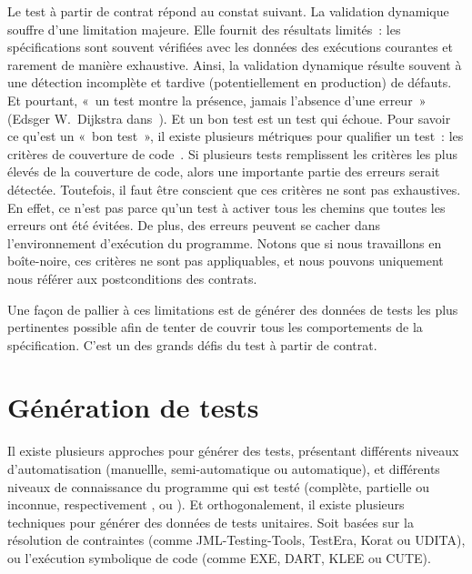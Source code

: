 Le test à partir de contrat répond au constat suivant. La validation dynamique
souffre d'une limitation majeure. Elle fournit des résultats limités~: les
spécifications sont souvent vérifiées avec les données des exécutions courantes
et rarement de manière exhaustive. Ainsi, la validation dynamique résulte
souvent à une détection incomplète et tardive (potentiellement en production) de
défauts. Et pourtant, «~un test montre la présence, jamais l'absence d'une
erreur~» (Edsger W.~Dijkstra dans~). Et un bon test est un test
qui échoue.  Pour savoir ce qu'est un «~bon test~», il existe plusieurs
métriques pour qualifier un test~: les critères de couverture de
code~.  Si plusieurs tests remplissent
les critères les plus élevés de la couverture de code, alors une importante
partie des erreurs serait détectée. Toutefois, il faut être conscient que ces
critères ne sont pas exhaustives. En effet, ce n'est pas parce qu'un test à
activer tous les chemins que toutes les erreurs ont été évitées. De plus, des
erreurs peuvent se cacher dans l'environnement d'exécution du programme. Notons
que si nous travaillons en boîte-noire, ces critères ne sont pas appliquables,
et nous pouvons uniquement nous référer aux postconditions des contrats.

Une façon de pallier à ces limitations est de générer des données de tests les
plus pertinentes possible afin de tenter de couvrir tous les comportements de la
spécification. C'est un des grands défis du test à partir de contrat.

\section{Génération de tests}

Il existe plusieurs approches pour générer des tests, présentant différents
niveaux d'automatisation (manuellle, semi-automatique ou automatique), et
différents niveaux de connaissance du programme qui est testé (complète,
partielle ou inconnue, respectivement ,
 ou ). Et orthogonalement, il existe
plusieurs techniques pour générer des données de tests unitaires. Soit basées
sur la résolution de contraintes (comme JML-Testing-Tools, TestEra, Korat ou
UDITA), ou l'exécution symbolique de code (comme EXE, DART, KLEE ou CUTE).

